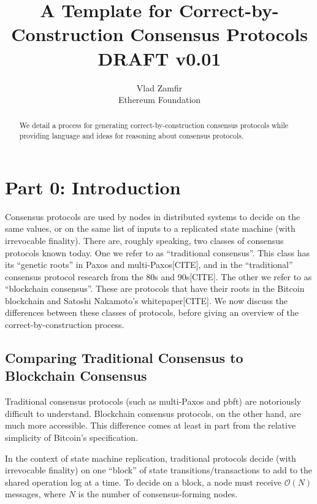 \documentclass{article}
\theoremstyle{definition}
\begin{document}
\title{A Template for Correct-by-Construction Consensus Protocols \\ \vspace{5mm} \small{DRAFT v0.01}}
\author{Vlad Zamfir \\ Ethereum Foundation}
\maketitle

\begin{abstract}
We detail a process for generating correct-by-construction consensus protocols while providing language and ideas for reasoning about consensus protocols.
\end{abstract}


\section{Part 0: Introduction}

Consensus protocols are used by nodes in distributed systems to decide on the same values, or on the same list of inputs to a replicated state machine (with irrevocable finality). There are, roughly speaking, two classes of consensus protocols known today. One we refer to as ``traditional consensus''. This class has its ``genetic roots'' in Paxos and multi-Paxos[CITE], and in the ``traditional'' consensus protocol research from the 80s and 90s[CITE]. The other we refer to as ``blockchain consensus''. These are protocols that have their roots in the Bitcoin blockchain and Satoshi Nakamoto's whitepaper[CITE]. We now discuss the differences between these classes of protocols, before giving an overview of the correct-by-construction process.

\subsection{Comparing Traditional Consensus to Blockchain Consensus}

Traditional consensus protocols (such as multi-Paxos and pbft) are notoriously difficult to understand\cite{paxos}. Blockchain consensus protocols, on the other hand, are much more accessible. This difference comes at least in part from the relative simplicity of Bitcoin's specification.

In the context of state machine replication, traditional protocols decide (with irrevocable finality) on one ``block'' of state transitions/transactions to add to the shared operation log at a time. To decide on a block, a node must receive $\mathcal{O}(N)$ messages, where $N$ is the number of consensus-forming nodes.
\end{document}
